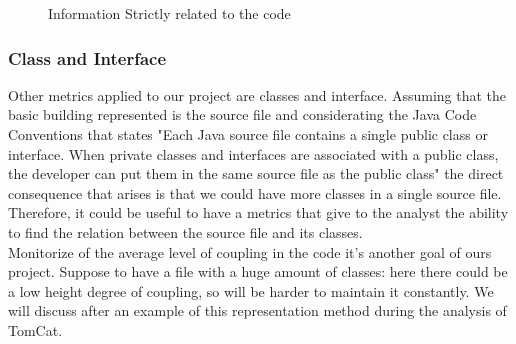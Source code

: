 \documentclass[]{usiinfbachelorproject}
\begin{document}
\begin{figure}[h]
\centering
{}
\hspace*{\fill}

\caption{Information Strictly related to the code}
\label{fig:strictly}
\end{figure}
\newpage

\subsubsection{Class and Interface}

Other metrics applied to our project are classes and interface.  Assuming that the basic building represented is the source file and considerating the Java Code Conventions that states \cite{oracle} "Each Java source file contains a single public class or interface. When private classes and interfaces are associated with a public class, the developer can put them in the same source file as the public class" the direct consequence that arises is that we could have more classes in a single source file. Therefore, it could be useful to have a metrics that give to the analyst the ability to find the relation between the source file and its classes. \\
Monitorize of the average level of coupling in the code it's another goal of ours project. Suppose to have a file with a huge amount of classes: here there could be a low height degree of coupling, so will be harder to maintain it constantly. We will discuss after an example of this representation method during the analysis of TomCat.
\end{document}
